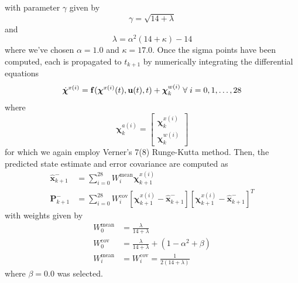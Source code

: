 \documentclass[letterpaper, paper,11pt]{AAS}		%
\begin{document}
with parameter $\gamma$ given by 
\begin{equation}
	\gamma = \sqrt{14 + \lambda}
\end{equation}
and 
\begin{equation}
	\lambda = \alpha^2(14 + \kappa) - 14
\end{equation}
where we've chosen $\alpha=1.0$ and $\kappa = 17.0$. Once the sigma points have been computed, each is propagated to $t_{k+1}$ by numerically integrating the differential equations
\begin{equation}
	\dot{\boldsymbol{\chi}}^{x(i)} = \mathbf{f}(\boldsymbol{\chi}^{x(i)}(t),\mathbf{u}(t), t)  + \boldsymbol{\chi}_k^{w(i)}\hspace{1mm}\forall\hspace{1mm}i=0,1,\dots,28
\end{equation}
where 
\begin{equation}
	\boldsymbol{\chi}_k^{a(i)} = \begin{bmatrix}
		\boldsymbol{\chi}_k^{x(i)} \\ \boldsymbol{\chi}_k^{w(i)}
	\end{bmatrix}
\end{equation}
for which we again employ Verner's 7(8) Runge-Kutta method. Then, the predicted state estimate and error covariance are computed as \cite{Crassidis_2004}
\begin{align}
	\hat{\mathbf{x}}_{k+1}^- &= \sum_{i=0}^{28}W_i^{\text{mean}}\boldsymbol{\chi}_{k+1}^{x(i)} \\
	\mathbf{P}_{k+1}^- &= \sum_{i=0}^{28}W_i^{\text{cov}} \left[\boldsymbol{\chi}_{k+1}^{x(i)} - \hat{\mathbf{x}}_{k+1}^-\right]\left[\boldsymbol{\chi}_{k+1}^{x(i)} - \hat{\mathbf{x}}_{k+1}^-\right]^T
\end{align}
with weights given by
\begin{align}
	W_0^\text{mean} &= \frac{\lambda}{14 + \lambda} \\
	W_0^\text{cov} &= \frac{\lambda}{14 + \lambda} + (1 - \alpha^2 + \beta) \\
	W_i^\text{mean} &= W_i^\text{cov} = \frac{1}{2(14 + \lambda)}
\end{align}
where $\beta = 0.0$ was selected. 
\end{document}
